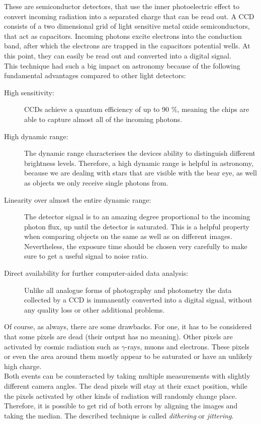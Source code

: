  These are semiconductor detectors, that use the inner photoelectric effect to convert incoming radiation into a separated charge that can be read out. A CCD consists of a two dimensional grid of light sensitive metal oxide semiconductors, that act as capacitors. Incoming photons excite electrons into the conduction band, after which the electrons are trapped in the capacitors potential wells. At this point, they can easily be read out and converted into a digital signal. \\
This technique had such a big impact on astronomy because of the following fundamental advantages compared to other light detectors:

\begin{description}
	\item[High sensitivity:] CCDs achieve a quantum efficiency of up to 90 \%, meaning the chips are  able to capture almost all of the incoming photons.
	\item[High dynamic range:] The dynamic range characterises the devices ability to distinguish different brightness levels.  Therefore, a high dynamic range is helpful in astronomy, because we are dealing with stars that are visible with the bear eye, as well as objects we only receive single photons from.
	\item[Linearity over almost the entire dynamic range:] The detector signal is to an amazing degree proportional to the incoming photon flux, up until the detector is saturated. This is a helpful property when comparing objects on the same as well as on different images. Nevertheless, the exposure time should be chosen very carefully to make sure to get a useful signal to noise ratio.
	\item[Direct availability for further computer-aided data analysis:] Unlike all analogue forms of photography and photometry the data collected by a CCD is immanently converted into a digital signal, without any quality loss or other additional problems. 
\end{description}

Of course, as always, there are some drawbacks. For one, it has to be considered that some pixels are dead (their output has no meaning). Other pixels are activated by cosmic radiation such as $\gamma$-rays, muons and electrons. These pixels or even the area around them mostly appear to be saturated or have an unlikely high charge.\\
Both events can be counteracted by taking multiple measurements with slightly different camera angles. The dead pixels will stay at their exact position, while the pixels activated by other kinds of radiation will randomly change place. Therefore, it is possible to get rid of both errors by aligning the images and taking the median. The described technique is called \textit{dithering} or \textit{jittering}.


